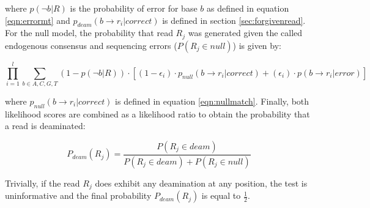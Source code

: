 \documentclass[a4paper,12pt]{article}
\begin{document}
\noindent where $p(\neg b|R)$ is the probability of error for base $b$ as defined in equation \ref{eqn:errormt} and $p_{deam}(b \to r_i | correct)$  is defined in section \ref{sec:forgivenread}. For the null model, the probability that read $R_j$ was generated given the called endogenous consensus and sequencing errors ($P(R_j \in null) $) is given by:

\begin{equation}
\prod_{i=1}^{l} \sum_{b \in {A,C,G,T} } (1-p(\neg b|R)) \cdot 
[ (1-\epsilon_i) \cdot p_{null}(b \to r_i | correct)
  + 
  (\epsilon_i) \cdot p(b \to r_i | error) ]
\end{equation} 

\noindent where $p_{null}(b \to r_i | correct)$  is defined in equation \ref{eqn:nullmatch}. Finally, both likelihood scores are combined as a likelihood ratio to obtain the probability that a read is deaminated:

\begin{equation}
P_{deam}(R_j) = \frac {P (R_j \in deam)} {P(R_j \in deam) +  P(R_j \in null)}
\end{equation}

\noindent Trivially, if the read $R_j$ does exhibit any deamination at any position, the test is uninformative and the final probability $P_{deam}(R_j)$ is equal to $\frac {1} {2}$.



\end{document}
